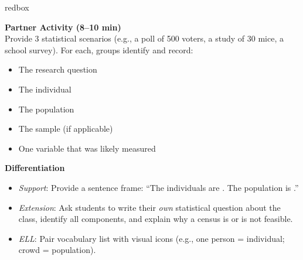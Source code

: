 \documentclass[10pt]{article}
\begin{document}
\begin{skillbox}{redbox}
\begin{minipage}[t]{0.48\linewidth}
    \textbf{Partner Activity (8--10 min)}\\
    Provide 3 statistical scenarios (e.g., a poll of 500 voters, a study of 30 mice, a school survey). For each, groups identify and record:
    \begin{itemize}
        \item The research question
        \item The individual
        \item The population
        \item The sample (if applicable)
        \item One variable that was likely measured
    \end{itemize}
\end{minipage}
\hfill
\begin{minipage}[t]{0.48\linewidth}
    \textbf{Differentiation}
    \begin{itemize}
        \item \textit{Support}: Provide a sentence frame: ``The individuals are \underline{\hspace{1cm}}. The population is \underline{\hspace{1cm}}.''
        \item \textit{Extension}: Ask students to write their \textit{own} statistical question about the class, identify all components, and explain why a census is or is not feasible.
        \item \textit{ELL}: Pair vocabulary list with visual icons (e.g., one person = individual; crowd = population).
    \end{itemize}
\end{minipage}
\end{skillbox}
\end{document}
